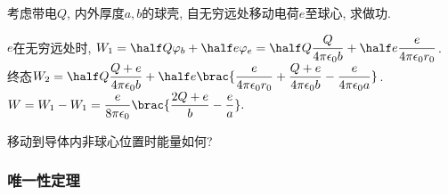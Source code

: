 \documentclass[hidelinks]{ctexart}
\begin{document}
\begin{sample}
    \begin{ex}
        考虑带电$Q$, 内外厚度$a,b$的球壳, 自无穷远处移动电荷$e$至球心, 求做功.
    \end{ex}
    \begin{solution}
        $e$在无穷远处时, $\displaystyle W_1 = \half Q\varphi_b + \half e\varphi_e = \half Q\frac{Q}{4\pi\epsilon_0 b} + \half e\frac{e}{4\pi\epsilon_0 r_0}$.\\
        终态$\displaystyle W_2 = \half Q\frac{Q+e}{4\pi\epsilon_0 b} + \half e\brac{\frac{e}{4\pi\epsilon_0 r_0} + \frac{Q+e}{4\pi\epsilon_0 b} - \frac{e}{4\pi\epsilon_0 a}}$.\\
        $\displaystyle W = W_1 - W_1 = \frac{e}{8\pi\epsilon_0} \brac{\frac{2Q+e}{b} - \frac{e}{a}}.$
    \end{solution}
\end{sample}
\begin{remark}
    移动到导体内非球心位置时能量如何?
\end{remark}


\subsubsection{唯一性定理} %
\label{ssub:唯一性定理}
\end{document}
